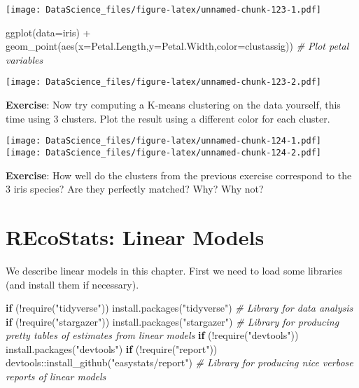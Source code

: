 \documentclass[
]{book}
\newenvironment{Shaded}{\begin{snugshade}}{\end{snugshade}}
\newcommand{\AttributeTok}[1]{\textcolor[rgb]{0.77,0.63,0.00}{#1}}
\newcommand{\CommentTok}[1]{\textcolor[rgb]{0.56,0.35,0.01}{\textit{#1}}}
\newcommand{\ControlFlowTok}[1]{\textcolor[rgb]{0.13,0.29,0.53}{\textbf{#1}}}
\newcommand{\FunctionTok}[1]{\textcolor[rgb]{0.00,0.00,0.00}{#1}}
\newcommand{\NormalTok}[1]{#1}
\newcommand{\SpecialCharTok}[1]{\textcolor[rgb]{0.00,0.00,0.00}{#1}}
\newcommand{\StringTok}[1]{\textcolor[rgb]{0.31,0.60,0.02}{#1}}
\begin{document}
\texttt{[image: DataScience\_files/figure-latex/unnamed-chunk-123-1.pdf]}

\begin{Shaded}
\begin{Highlighting}[]
\FunctionTok{ggplot}\NormalTok{(}\AttributeTok{data=}\NormalTok{iris) }\SpecialCharTok{+} \FunctionTok{geom\_point}\NormalTok{(}\FunctionTok{aes}\NormalTok{(}\AttributeTok{x=}\NormalTok{Petal.Length,}\AttributeTok{y=}\NormalTok{Petal.Width,}\AttributeTok{color=}\NormalTok{clustassig)) }\CommentTok{\# Plot petal variables}
\end{Highlighting}
\end{Shaded}

\texttt{[image: DataScience\_files/figure-latex/unnamed-chunk-123-2.pdf]}

\textbf{Exercise}: Now try computing a K-means clustering on the data yourself, this time using 3 clusters. Plot the result using a different color for each cluster.

\texttt{[image: DataScience\_files/figure-latex/unnamed-chunk-124-1.pdf]} \texttt{[image: DataScience\_files/figure-latex/unnamed-chunk-124-2.pdf]}

\textbf{Exercise}: How well do the clusters from the previous exercise correspond to the 3 iris species? Are they perfectly matched? Why? Why not?

\hypertarget{recostats-linear-models}{%
\chapter{REcoStats: Linear Models}\label{recostats-linear-models}}

We describe linear models in this chapter. First we need to load some libraries (and install them if necessary).

\begin{Shaded}
\begin{Highlighting}[]
\ControlFlowTok{if}\NormalTok{ (}\SpecialCharTok{!}\FunctionTok{require}\NormalTok{(}\StringTok{"tidyverse"}\NormalTok{)) }\FunctionTok{install.packages}\NormalTok{(}\StringTok{"tidyverse"}\NormalTok{) }\CommentTok{\# Library for data analysis}
\ControlFlowTok{if}\NormalTok{ (}\SpecialCharTok{!}\FunctionTok{require}\NormalTok{(}\StringTok{"stargazer"}\NormalTok{)) }\FunctionTok{install.packages}\NormalTok{(}\StringTok{"stargazer"}\NormalTok{) }\CommentTok{\# Library for producing pretty tables of estimates from linear models}
\ControlFlowTok{if}\NormalTok{ (}\SpecialCharTok{!}\FunctionTok{require}\NormalTok{(}\StringTok{"devtools"}\NormalTok{)) }\FunctionTok{install.packages}\NormalTok{(}\StringTok{"devtools"}\NormalTok{)}
\ControlFlowTok{if}\NormalTok{ (}\SpecialCharTok{!}\FunctionTok{require}\NormalTok{(}\StringTok{"report"}\NormalTok{)) devtools}\SpecialCharTok{::}\FunctionTok{install\_github}\NormalTok{(}\StringTok{"easystats/report"}\NormalTok{) }\CommentTok{\# Library for producing nice verbose reports of linear models}
\end{Highlighting}
\end{Shaded}
\end{document}
